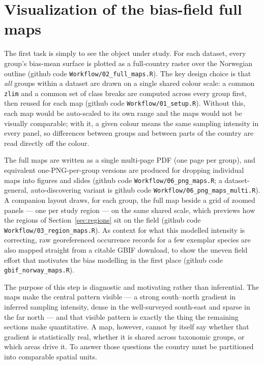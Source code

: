 \section{Visualization of the bias-field full maps}
\label{sec:fullmaps}

The first task is simply to see the object under study. For each dataset,
every group's bias-mean surface is plotted as a full-country raster over
the Norwegian outline (github code \texttt{Workflow/02\_full\_maps.R}). The
key design choice is that \emph{all} groups within a dataset are drawn on a
single shared colour scale: a common \texttt{zlim} and a common set of
class breaks are computed across every group first, then reused for each
map (github code \texttt{Workflow/01\_setup.R}). Without this, each map
would be auto-scaled to its own range and the maps would not be visually
comparable; with it, a given colour means the same sampling intensity in
every panel, so differences between groups and between parts of the
country are read directly off the colour.

The full maps are written as a single multi-page PDF (one page per group),
and equivalent one-PNG-per-group versions are produced for dropping
individual maps into figures and slides (github code
\texttt{Workflow/06\_png\_maps.R}; a dataset-general, auto-discovering
variant is github code \texttt{Workflow/06\_png\_maps\_multi.R}). A
companion layout draws, for each group, the full map beside a grid of
zoomed panels --- one per study region --- on the same shared scale, which
previews how the regions of Section~\ref{sec:regions} sit on the field
(github code \texttt{Workflow/03\_region\_maps.R}). As context for what
this modelled intensity is correcting, raw georeferenced occurrence records
for a few exemplar species are also mapped straight from a citable GBIF
download, to show the uneven field effort that motivates the bias modelling
in the first place (github code \texttt{gbif\_norway\_maps.R}).

The purpose of this step is diagnostic and motivating rather than
inferential. The maps make the central pattern visible --- a strong
south--north gradient in inferred sampling intensity, dense in the
well-surveyed south-east and sparse in the far north --- and that visible
pattern is exactly the thing the remaining sections make quantitative.
A map, however, cannot by itself say whether that gradient is statistically
real, whether it is shared across taxonomic groups, or which areas drive
it. To answer those questions the country must be partitioned into
comparable spatial units.

